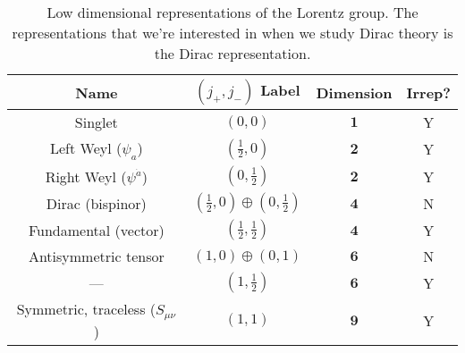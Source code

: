 \documentclass[12pt, oneside]{article}   	%
\theoremstyle{definition}
\begin{document}
\begin{table}[H]
	\centering
	\begin{tabular}{  c | c  c  c  }
		\hline\hline
		\rule{0cm}{0.4cm}Name & $(j_+, j_-)$ Label & Dimension & Irrep? \\
		\hline
		Singlet & $(0, 0)$ & $\bm 1$ & Y \\
		Left Weyl ($\psi_a$) & $(\frac{1}{2}, 0)$ & $\bm 2$ & Y \\
		Right Weyl ($\psi^{\dot a}$) & $(0, \frac{1}{2})$ & $\bm 2$ & Y \\
		Dirac (bispinor) & $(\frac{1}{2}, 0)\oplus (0, \frac{1}{2})$ & $\bm 4$ & N \\
		Fundamental (vector) & $(\frac{1}{2}, \frac{1}{2})$ & $\bm 4$ & Y \\
		Antisymmetric tensor & $(1, 0)\oplus (0, 1)$ & $\bm 6$ & N \\
		--- & $(1, \frac{1}{2})$ & $\bm 6$ & Y \\
		Symmetric, traceless ($S_{\mu\nu}$) & $(1, 1)$ & $\bm 9$ & Y \\ 
		\hline \hline
	\end{tabular}
	\caption{Low dimensional representations of the Lorentz group. The representations that we're interested in when we study Dirac theory is the Dirac representation.}
\end{table}
\end{document}
